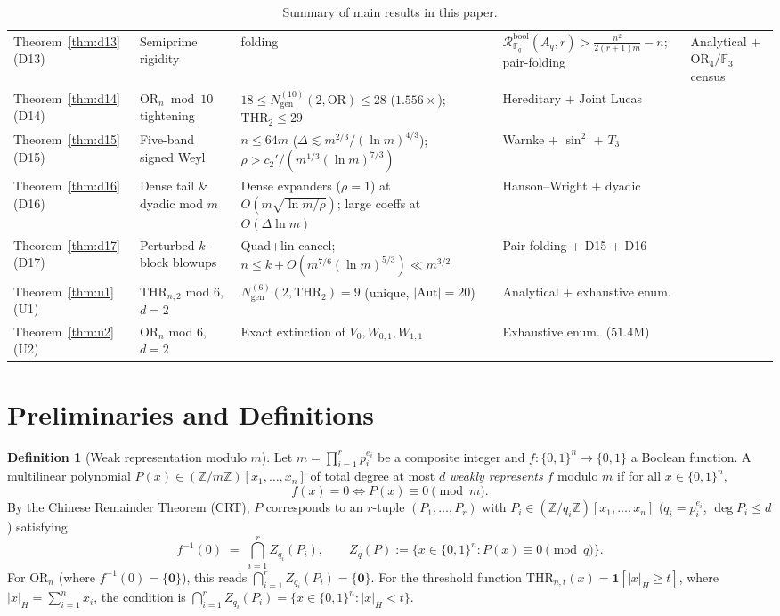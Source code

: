 \documentclass[11pt,a4paper]{article}
\theoremstyle{definition}
\newtheorem{definition}[theorem]{Definition}
\newcommand{\F}{\mathbb{F}}
\newcommand{\Z}{\mathbb{Z}}
\newcommand{\OR}{\mathrm{OR}}
\newcommand{\THR}{\mathrm{THR}}
\newcommand{\Ngen}{N_{\mathrm{gen}}}
\newcommand{\Aut}{\mathrm{Aut}}
\begin{document}
\begin{table}[ht]
\begin{tabular}{@{}llll@{}}
Theorem~\ref{thm:d13} (D13) & Semiprime rigidity & folding & $\mathcal{R}_{\F_q}^{\mathrm{bool}}(A_q, r) > \frac{n^2}{2(r+1)m}-n$; pair-folding & Analytical + $\OR_4/\F_3$ census \\
Theorem~\ref{thm:d14} (D14) & $\OR_n \bmod 10$ tightening & $18 \le \Ngen^{(10)}(2, \OR) \le 28$ ($1.556\times$); $\THR_2 \le 29$ & Hereditary + Joint Lucas \\
Theorem~\ref{thm:d15} (D15) & Five-band signed Weyl & $n \le 64m$ ($\Delta \lesssim m^{2/3}/(\ln m)^{4/3}$); $\rho > c_2'/(m^{1/3}(\ln m)^{7/3})$ & Warnke + $\sin^2$ + $T_3$ \\
Theorem~\ref{thm:d16} (D16) & Dense tail \& dyadic mod $m$ & Dense expanders ($\rho=1$) at $O(m\sqrt{\ln m/\rho})$; large coeffs at $O(\Delta\ln m)$ & Hanson--Wright + dyadic \\
Theorem~\ref{thm:d17} (D17) & Perturbed $k$-block blowups & Quad+lin cancel; $n \le k + O(m^{7/6}(\ln m)^{5/3}) \ll m^{3/2}$ & Pair-folding + D15 + D16 \\
Theorem~\ref{thm:u1} (U1) & $\THR_{n,2}$ mod $6$, $d=2$ & $\Ngen^{(6)}(2, \THR_2) = 9$ (unique, $|\Aut|=20$) & Analytical + exhaustive enum. \\
Theorem~\ref{thm:u2} (U2) & $\OR_n$ mod $6$, $d=2$ & Exact extinction of $V_0, W_{0,1}, W_{1,1}$ & Exhaustive enum.\ ($51.4\text{M}$) \\
\bottomrule
\end{tabular}
\caption{Summary of main results in this paper.}
\label{tab:summary}
\end{table}

\section{Preliminaries and Definitions}
\label{sec:prelim}

\begin{definition}[Weak representation modulo $m$]
Let $m = \prod_{i=1}^r p_i^{e_i}$ be a composite integer and $f : \{0,1\}^n \to \{0,1\}$ a Boolean function. A multilinear polynomial $P(x) \in (\Z/m\Z)[x_1,\dots,x_n]$ of total degree at most $d$ \emph{weakly represents} $f$ modulo $m$ if for all $x \in \{0,1\}^n$,
\[
  f(x) = 0 \iff P(x) \equiv 0 \pmod m.
\]
By the Chinese Remainder Theorem (CRT), $P$ corresponds to an $r$-tuple $(P_1,\dots,P_r)$ with $P_i \in (\Z/q_i\Z)[x_1,\dots,x_n]$ ($q_i = p_i^{e_i}$, $\deg P_i \le d$) satisfying
\[
  f^{-1}(0) \;=\; \bigcap_{i=1}^r Z_{q_i}(P_i),
  \qquad Z_q(P) := \{x \in \{0,1\}^n : P(x) \equiv 0 \pmod q\}.
\]
For $\OR_n$ (where $f^{-1}(0) = \{\mathbf{0}\}$), this reads $\bigcap_{i=1}^r Z_{q_i}(P_i) = \{\mathbf{0}\}$. For the threshold function $\THR_{n,t}(x) = \mathbf{1}[|x|_H \ge t]$, where $|x|_H = \sum_{i=1}^n x_i$, the condition is $\bigcap_{i=1}^r Z_{q_i}(P_i) = \{x \in \{0,1\}^n : |x|_H < t\}$.
\end{definition}
\end{document}
